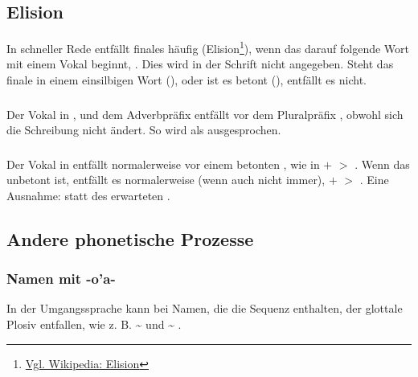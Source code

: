 \subsection{Elision} In schneller Rede entfällt finales  häufig (Elision\footnote{\href{https://de.wikipedia.org/wiki/Elision}{Vgl. Wikipedia: Elision}}), wenn das darauf folgende Wort mit einem Vokal beginnt, . Dies wird in der Schrift nicht angegeben.
Steht das finale  in einem einsilbigen Wort (), oder ist es betont (), entfällt es nicht.

\subsubsection{} Der Vokal  in ,  und dem Adverbpräfix  entfällt vor dem Pluralpräfix , obwohl sich die Schreibung nicht ändert. So wird   als  ausgesprochen.\label{lands:elision-i}

\subsubsection{} Der Vokal in  entfällt normalerweise vor einem betonten , wie in  $+$  $>$ . Wenn das  unbetont ist, entfällt es normalerweise (wenn auch nicht immer),  $+$  $>$ . Eine Ausnahme:  statt des erwarteten .

\subsection{Andere phonetische Prozesse}

\subsubsection{Namen mit -o'a-} \label{names-with-oa}
In der Umgangssprache kann bei Namen, die die Sequenz  enthalten, der glottale Plosiv entfallen, wie z. B.  \textasciitilde{}  und  \textasciitilde{} .

